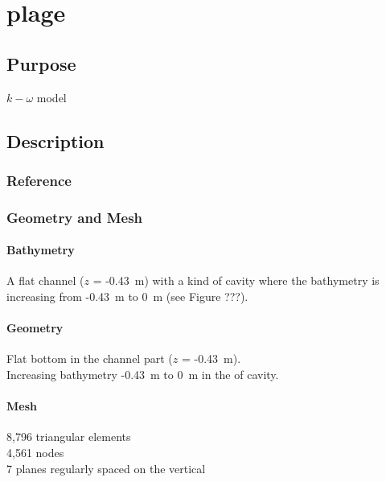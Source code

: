 \chapter{plage}
%
%
\section{Purpose}
%
$k-\omega$ model
%
\section{Description}
%
%
%
%
\subsection{Reference}
%

%
%
%
\subsection{Geometry and Mesh}
%
\subsubsection{Bathymetry}
%
A flat channel ($z$ = -0.43~m) with a kind of cavity where the
bathymetry is increasing from -0.43~m to 0~m (see Figure ???).
%
\subsubsection{Geometry}
%
Flat bottom in the channel part ($z$ = -0.43~m).\\
Increasing bathymetry -0.43~m to 0~m in the of cavity.
%
\subsubsection{Mesh}
%
8,796 triangular elements\\
4,561 nodes\\
7 planes regularly spaced on the vertical
%
%
%
